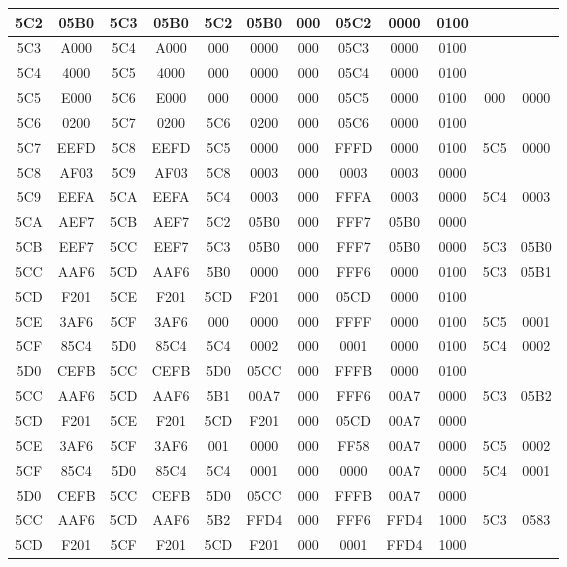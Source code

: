 \begin{center}
\begin{tabular}{|c|c|c|c|c|c|c|c|c|c|c|c|}
5C2 & 05B0 & 5C3 & 05B0 & 5C2 & 05B0 & 000 & 05C2 & 0000 & 0100 &  &  \\ \hline
5C3 & A000 & 5C4 & A000 & 000 & 0000 & 000 & 05C3 & 0000 & 0100 &  &  \\ \hline
5C4 & 4000 & 5C5 & 4000 & 000 & 0000 & 000 & 05C4 & 0000 & 0100 &  &  \\ \hline
5C5 & E000 & 5C6 & E000 & 000 & 0000 & 000 & 05C5 & 0000 & 0100 & 000 & 0000 \\ \hline
5C6 & 0200 & 5C7 & 0200 & 5C6 & 0200 & 000 & 05C6 & 0000 & 0100 &  &  \\ \hline
5C7 & EEFD & 5C8 & EEFD & 5C5 & 0000 & 000 & FFFD & 0000 & 0100 & 5C5 & 0000 \\ \hline
5C8 & AF03 & 5C9 & AF03 & 5C8 & 0003 & 000 & 0003 & 0003 & 0000 &  &  \\ \hline
5C9 & EEFA & 5CA & EEFA & 5C4 & 0003 & 000 & FFFA & 0003 & 0000 & 5C4 & 0003 \\ \hline
5CA & AEF7 & 5CB & AEF7 & 5C2 & 05B0 & 000 & FFF7 & 05B0 & 0000 &  &  \\ \hline
5CB & EEF7 & 5CC & EEF7 & 5C3 & 05B0 & 000 & FFF7 & 05B0 & 0000 & 5C3 & 05B0 \\ \hline
5CC & AAF6 & 5CD & AAF6 & 5B0 & 0000 & 000 & FFF6 & 0000 & 0100 & 5C3 & 05B1 \\ \hline
5CD & F201 & 5CE & F201 & 5CD & F201 & 000 & 05CD & 0000 & 0100 &  &  \\ \hline
5CE & 3AF6 & 5CF & 3AF6 & 000 & 0000 & 000 & FFFF & 0000 & 0100 & 5C5 & 0001 \\ \hline
5CF & 85C4 & 5D0 & 85C4 & 5C4 & 0002 & 000 & 0001 & 0000 & 0100 & 5C4 & 0002 \\ \hline
5D0 & CEFB & 5CC & CEFB & 5D0 & 05CC & 000 & FFFB & 0000 & 0100 &  &  \\ \hline
5CC & AAF6 & 5CD & AAF6 & 5B1 & 00A7 & 000 & FFF6 & 00A7 & 0000 & 5C3 & 05B2 \\ \hline
5CD & F201 & 5CE & F201 & 5CD & F201 & 000 & 05CD & 00A7 & 0000 &  &  \\ \hline
5CE & 3AF6 & 5CF & 3AF6 & 001 & 0000 & 000 & FF58 & 00A7 & 0000 & 5C5 & 0002 \\ \hline
5CF & 85C4 & 5D0 & 85C4 & 5C4 & 0001 & 000 & 0000 & 00A7 & 0000 & 5C4 & 0001 \\ \hline
5D0 & CEFB & 5CC & CEFB & 5D0 & 05CC & 000 & FFFB & 00A7 & 0000 &  &  \\ \hline
5CC & AAF6 & 5CD & AAF6 & 5B2 & FFD4 & 000 & FFF6 & FFD4 & 1000 & 5C3 & 0583 \\ \hline
5CD & F201 & 5CF & F201 & 5CD & F201 & 000 & 0001 & FFD4 & 1000 &  &  \\ \hline

\end{tabular}
\end{center}
